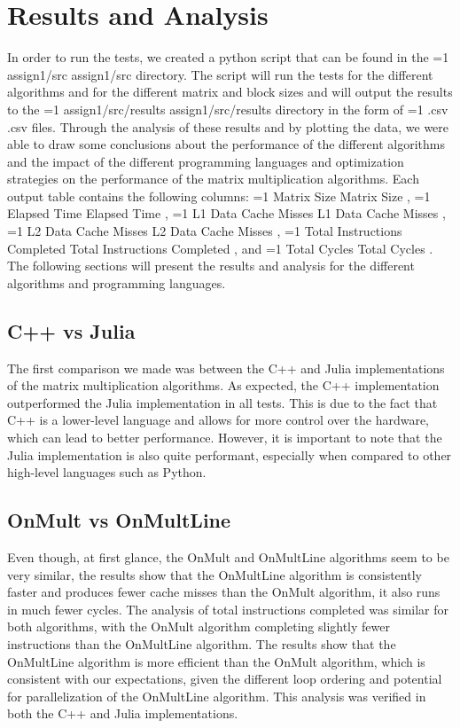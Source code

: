 \documentclass[11pt,a4paper]{article}
\newcommand{\hl}[2][1]{%
  \ifnum#1=1\relax
    \textcolor{text-hl1}{#2}%
  \else
    \textcolor{text-hl2}{#2}%
  \fi
}
\begin{document}
\section{Results and Analysis}
In order to run the tests, we created a python script that can be found in the \hl{assign1/src} directory.
The script will run the tests for the different algorithms and for the different matrix and block sizes and 
will output the results to the \hl{assign1/src/results} directory in the form of \hl{.csv} files.
Through the analysis of these results and by plotting the data, we were able to draw some conclusions
about the performance of the different algorithms and the impact of the different programming languages
and optimization strategies on the performance of the matrix multiplication algorithms.
Each output table contains the following columns: \hl{Matrix Size}, \hl{Elapsed Time}, \hl{L1 Data Cache Misses},
\hl{L2 Data Cache Misses}, \hl{Total Instructions Completed}, and \hl{Total Cycles}.
The following sections will present the results and analysis for the different algorithms and programming languages.

\subsection{C++ vs Julia}
The first comparison we made was between the C++ and Julia implementations of the matrix multiplication algorithms.
As expected, the C++ implementation outperformed the Julia implementation in all tests. This is due to the fact that
C++ is a lower-level language and allows for more control over the hardware, which can lead to better performance.
However, it is important to note that the Julia implementation is also quite performant, especially when compared to
other high-level languages such as Python.

\subsection{OnMult vs OnMultLine}
Even though, at first glance, the OnMult and OnMultLine algorithms seem to be very similar, the results show that
the OnMultLine algorithm is consistently faster and produces fewer cache misses than the OnMult algorithm, it also
runs in much fewer cycles. The analysis of total instructions completed was similar for both algorithms, with the
OnMult algorithm completing slightly fewer instructions than the OnMultLine algorithm. 
The results show that the OnMultLine algorithm is more efficient than the OnMult algorithm, which is consistent with
our expectations, given the different loop ordering and potential for parallelization of the OnMultLine algorithm.
This analysis was verified in both the C++ and Julia implementations.
\end{document}

